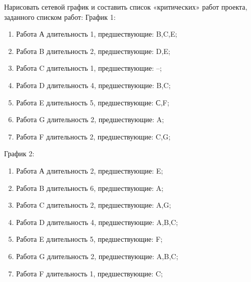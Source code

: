 \question
Нарисовать сетевой график и составить список «критических»
работ проекта, заданного списком работ:
График 1:
\begin{enumerate}
\item  Работа А длительность 1, предшествующие: B,C,E;
\item  Работа B длительность 2, предшествующие: D,E;
\item  Работа C длительность 1, предшествующие: --;
\item  Работа D длительность 4, предшествующие: B,C;
\item  Работа E длительность 5, предшествующие: С,F;
\item  Работа G длительность 2, предшествующие: A;
\item  Работа F длительность 2, предшествующие: C,G;
\end{enumerate}
График 2:
\begin{enumerate}
\item  Работа А длительность 2, предшествующие: E;
\item  Работа B длительность 6, предшествующие: A;
\item  Работа C длительность 2, предшествующие: A,G;
\item  Работа D длительность 4, предшествующие: A,B,C;
\item  Работа E длительность 5, предшествующие: F;
\item  Работа G длительность 2, предшествующие: A,B,C;
\item  Работа F длительность 1, предшествующие: C;
\end{enumerate}